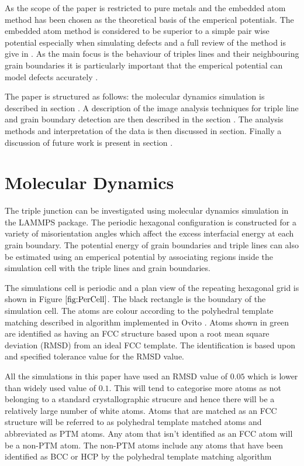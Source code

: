 \documentclass[12pt,a4paper]{book}
\begin{document}
As the scope of the paper is restricted to pure metals and the embedded atom method has been chosen as the theoretical basis of the emperical potentials. The embedded atom method is considered to be superior to a simple pair wise potential especially when simulating defects and a full review of the method is give in \cite{Daw1993}. As the main focus is the behaviour of triples lines and their neighbouring grain boundaries it is particularly important that the emperical potential can model defects accurately . 


The paper is structured as follows: the molecular dynamics simulation is described in section . A description of the image analysis techniques for triple line and grain boundary detection are then described in the section . The analysis methods and interpretation of the data is then discussed in section. Finally a  discussion of future work is present in section .

 

\chapter{Molecular Dynamics}
The triple junction can be investigated using molecular dynamics simulation in the LAMMPS package. The periodic hexagonal configuration is constructed for a variety of misorientation angles which affect the excess interfacial energy at each grain boundary. The potential energy of grain boundaries and triple lines can also be estimated using an emperical potential by associating regions inside the simulation cell with the triple lines and grain boundaries.

The simulations cell is periodic and a plan view of the repeating hexagonal grid is shown in Figure $\ref{fig:PerCell}$. The black rectangle is the boundary of the simulation cell. The atoms are colour according to the polyhedral template matching described in \cite{Larsen_2016} algorithm implemented in Ovito \cite{Stukowski2009}. Atoms shown in green are identified as having an FCC structure based upon a root mean square deviation (RMSD) from an ideal FCC template. The identification is based upon and specified tolerance value for the RMSD value. 

All the simulations in this paper have used an RMSD value of $0.05$ which is lower than widely used value of $0.1$. This will tend to categorise more atoms as not belonging to a standard crystallographic strucure and hence there will be a relatively large number of white atoms. Atoms that are matched as an FCC structure will be referred to as polyhedral template matched atoms and abbreviated as PTM atoms. Any atom that isn't identified as an FCC atom will be a non-PTM atom. The non-PTM atoms include any atoms that have been identified as BCC or HCP by the polyhedral template matching algorithm 
 
\end{document}
